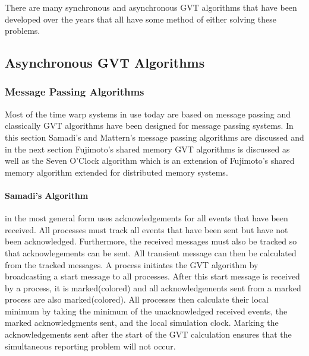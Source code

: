 \documentclass[11pt]{book}
\begin{document}
\noindent
There are many synchronous and asynchronous GVT algorithms that have been developed over the
years that all have some method of either solving these problems.

\subsection{Asynchronous GVT Algorithms}

\subsubsection{Message Passing Algorithms}

Most of the time warp systems in use today are based on message passing and classically
GVT algorithms have been designed for message passing systems. In this section Samadi's and
Mattern's message passing algorithms are discussed and in the next section Fujimoto's shared
memory GVT algorithms is discussed as well as the Seven O'Clock algorithm which is an
extension of Fujimoto's shared memory algorithm extended for distributed memory systems.

\paragraph{Samadi's Algorithm}\cite{samadi-85} in the most general form uses acknowledgements
for all events that have been received. All processes must track all events that have been
sent but have not been acknowledged. Furthermore, the received messages must also be tracked
so that acknowlegements can be sent. All transient message can then be calculated from the
tracked messages. A process initiates the GVT algorithm by broadcasting a start message to
all processes. After this start message is received by a process, it is marked(colored) and
all acknowledgements sent from a marked process are also marked(colored). All processes then
calculate their local minimum by taking the minimum of the unacknowledged received events,
the marked acknowledgments sent, and the local simulation clock. Marking the acknowledgements
sent after the start of the GVT calculation ensures that the simultaneous reporting problem
will not occur.
\end{document}
